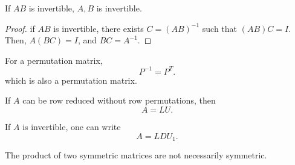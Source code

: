 
\begin{theorem}
	If \( AB \) is invertible, \( A,B \) is invertible.
\end{theorem}
\begin{proof}
	if \( AB \) is invertible, there exists \( C = (AB)^{-1}  \) such that \( (AB)C = I \). Then, \( A(BC) = I \), and \( BC = A^{-1}  \).
\end{proof}

\begin{prop}
	For a permutation matrix,\[
		P^{-1}  = P^{T} 
	.\] which is also a permutation matrix.
\end{prop}

\begin{prop}
	If \( A \) can be row reduced without row permutations, then \[
		A = LU
	.\] 
\end{prop}

\begin{prop}
	If \( A \) is invertible, one can write \[
		A = LDU_{1}
	.\]  
\end{prop}

\begin{note}
	The product of two symmetric matrices are not necessarily symmetric.
\end{note}
